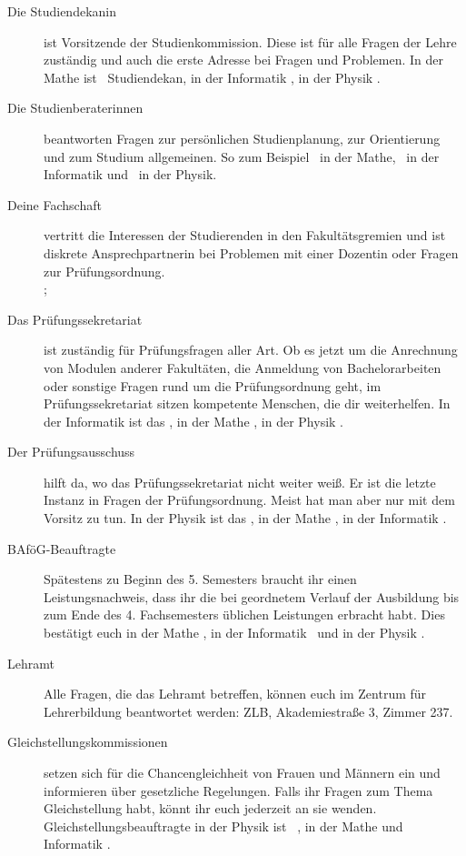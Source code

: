 \begin{description}
    \item[Die Studiendekanin] ist Vorsitzende der Studienkommission. Diese ist für alle Fragen der Lehre zuständig und auch die erste Adresse bei Fragen und Problemen. In der Mathe ist \studiendekanmathe\ Studiendekan, in der Informatik \studiendekaninformatik , in der Physik \studiendekanphysik .

    \item[Die Studienberaterinnen] beantworten Fragen zur persönlichen Studienplanung, zur Orientierung und zum Studium allgemeinen. So zum Beispiel \studienberatungmathe\ in der Mathe, \studienberatunginformatik\ in der Informatik und \studienberatungphysik\ in der Physik.

    \item[Deine Fachschaft] vertritt die Interessen der Studierenden in den Fakultätsgremien und ist diskrete Ansprechpartnerin bei Problemen mit einer Dozentin oder Fragen zur Prüfungsordnung. \\\fsraum; 

    \item[Das Prüfungssekretariat] ist zuständig für Prüfungsfragen aller Art. Ob es jetzt um die Anrechnung von Modulen anderer Fakultäten, die Anmeldung von Bachelorarbeiten oder sonstige Fragen rund um die Prüfungsordnung geht, im Prüfungssekretariat sitzen kompetente Menschen, die dir weiterhelfen. In der Informatik ist das \pruefsekinfo, in der Mathe \pruefsekmathe, in der Physik \pruefsekphysik.

    \item[Der Prüfungsausschuss] hilft da, wo das Prüfungssekretariat nicht weiter weiß. Er ist die letzte Instanz in Fragen der Prüfungsordnung. Meist hat man aber nur mit dem Vorsitz zu tun. In der Physik ist das \pruefausschussvorsitzphysik, in der Mathe \pruefausschussvorsitzmathe, in der Informatik \pruefausschussvorsitzinformatik.

    \item[BAföG-Beauftragte] Spätestens zu Beginn des 5. Semesters braucht ihr einen Leistungsnachweis, dass ihr die bei geordnetem Verlauf der Ausbildung bis zum Ende des 4. Fachsemesters üblichen Leistungen erbracht habt. Dies bestätigt euch in der Mathe \bafogmathe , in der Informatik \bafoginformatik\ und in der Physik \bafogphysik .

    \item[Lehramt] Alle Fragen, die das Lehramt betreffen, können euch im Zentrum für Lehrerbildung beantwortet werden: ZLB, Akademiestraße 3, Zimmer 237.

    \item[Gleichstellungskommissionen] setzen sich für die Chancengleichheit von Frauen und Männern ein und informieren über gesetzliche Regelungen. Falls ihr Fragen zum Thema Gleichstellung habt, könnt ihr euch jederzeit an sie wenden. Gleichstellungsbeauftragte in der Physik ist \gleichstellungsbeauftragtephysik\ , in der Mathe und Informatik \gleichstellungsbeauftragtemathe.

\end{description}

